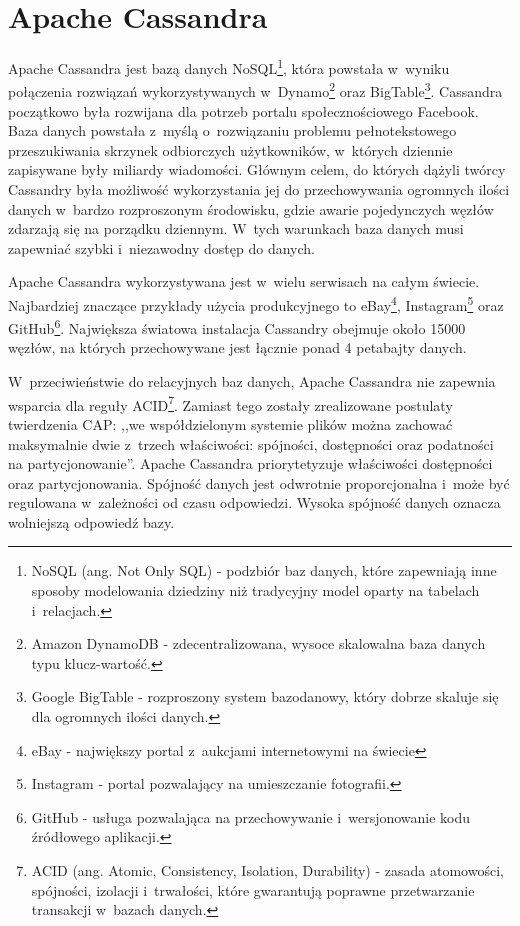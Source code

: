 
\chapter{Apache Cassandra}

Apache Cassandra jest bazą danych NoSQL\footnote{NoSQL (ang. Not Only SQL) - podzbiór baz danych, które zapewniają inne sposoby modelowania dziedziny niż tradycyjny model oparty na tabelach i~relacjach.}, która powstała w~wyniku połączenia rozwiązań wykorzystywanych w~Dynamo\footnote{Amazon DynamoDB - zdecentralizowana, wysoce skalowalna baza danych typu klucz-wartość.} oraz BigTable\footnote{Google BigTable - rozproszony system bazodanowy, który dobrze skaluje się dla ogromnych ilości danych.}. Cassandra początkowo była rozwijana dla potrzeb portalu społecznościowego Facebook. Baza danych powstała z~myślą o~rozwiązaniu problemu pełnotekstowego przeszukiwania skrzynek odbiorczych użytkowników, w~których dziennie zapisywane były miliardy wiadomości. Głównym celem, do których dążyli twórcy Cassandry była możliwość wykorzystania jej do przechowywania ogromnych ilości danych w~bardzo rozproszonym środowisku, gdzie awarie pojedynczych węzłów zdarzają się na porządku dziennym. W~tych warunkach baza danych musi zapewniać szybki i~niezawodny dostęp do danych. \cite{cassandra_introduction} 

Apache Cassandra wykorzystywana jest w~wielu serwisach na całym świecie. Najbardziej znaczące przykłady użycia produkcyjnego to eBay\footnote{eBay - największy portal z~aukcjami internetowymi na świecie}, Instagram\footnote{Instagram - portal pozwalający na umieszczanie fotografii.} oraz GitHub\footnote{GitHub - usługa pozwalająca na przechowywanie i~wersjonowanie kodu źródłowego aplikacji.}. Największa światowa instalacja Cassandry obejmuje około 15000 węzłów, na których przechowywane jest łącznie ponad 4 petabajty danych. \cite{official_cassandra}

W~przeciwieństwie do relacyjnych baz danych, Apache Cassandra nie zapewnia wsparcia dla reguły ACID\footnote{ACID (ang. Atomic, Consistency, Isolation, Durability) - zasada atomowości, spójności, izolacji i~trwałości, które gwarantują poprawne przetwarzanie transakcji w~bazach danych.}. Zamiast tego zostały zrealizowane postulaty twierdzenia CAP: ,,we współdzielonym systemie plików można zachować maksymalnie dwie z~trzech właściwości: spójności, dostępności oraz podatności na partycjonowanie''. \cite{cap_theorem} Apache Cassandra priorytetyzuje właściwości dostępności oraz partycjonowania. Spójność danych jest odwrotnie proporcjonalna i~może być regulowana w~zależności od czasu odpowiedzi. Wysoka spójność danych oznacza wolniejszą odpowiedź bazy.

